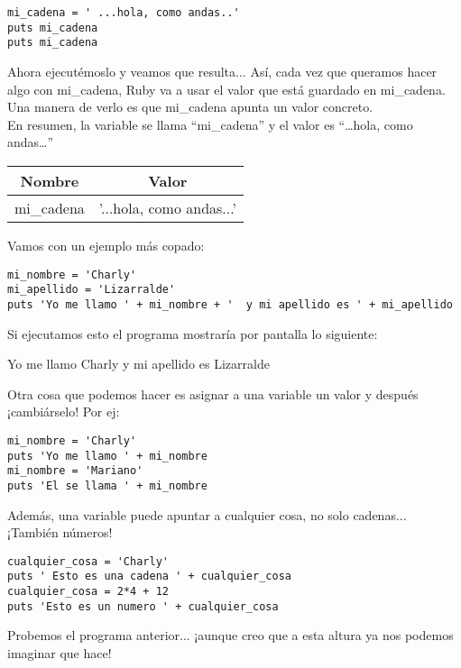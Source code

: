 \begin{lstlisting}
mi_cadena = ' ...hola, como andas..'
puts mi_cadena
puts mi_cadena
\end{lstlisting}

Ahora ejecutémoslo y veamos que resulta...
Así, cada vez que queramos hacer algo con mi\_cadena, Ruby va a usar el valor que está guardado en mi\_cadena. Una manera de verlo es que mi\_cadena apunta un valor concreto.\\

En resumen, la variable se llama “mi\_cadena” y el valor es “…hola, como andas…”

\begin{center}
\begin{tabular}{|c|c|}
\hline
\rowcolor[gray]{0.9}Nombre & Valor \\
\hline
mi\_cadena & '...hola, como andas...' \\
\hline
\end{tabular}
\end{center}

Vamos con un ejemplo más copado:

\begin{lstlisting}
mi_nombre = 'Charly'
mi_apellido = 'Lizarralde'
puts 'Yo me llamo ' + mi_nombre + '  y mi apellido es ' + mi_apellido
\end{lstlisting}

Si ejecutamos esto el programa mostraría por pantalla lo siguiente:

\begin{console-output}
Yo me llamo Charly y mi apellido es Lizarralde
\end{console-output}

Otra cosa que podemos hacer es asignar a una variable un valor y después ¡cambiárselo! Por ej: 

\begin{lstlisting}
mi_nombre = 'Charly'
puts 'Yo me llamo ' + mi_nombre
mi_nombre = 'Mariano'
puts 'El se llama ' + mi_nombre
\end{lstlisting}

Además, una variable puede apuntar a cualquier cosa, no solo cadenas... ¡También números! 

\begin{lstlisting}
cualquier_cosa = 'Charly'
puts ' Esto es una cadena ' + cualquier_cosa
cualquier_cosa = 2*4 + 12
puts 'Esto es un numero ' + cualquier_cosa
\end{lstlisting}

Probemos el programa anterior... ¡aunque creo que a esta altura ya nos podemos imaginar que hace!\\

